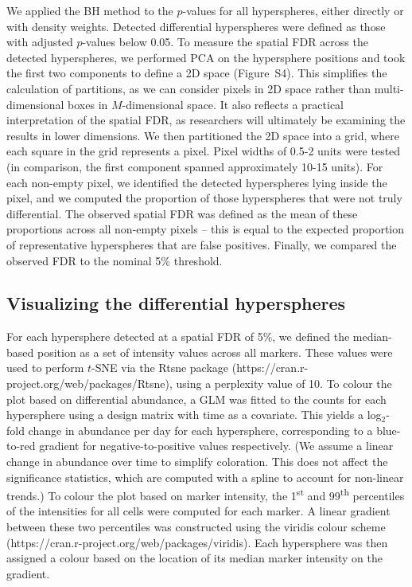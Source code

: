 \documentclass{article}
\newcommand{\suppfigfdr}{S4}
\begin{document}
We applied the BH method to the $p$-values for all hyperspheres, either directly or with density weights.
Detected differential hyperspheres were defined as those with adjusted $p$-values below 0.05.
To measure the spatial FDR across the detected hyperspheres, we performed PCA on the hypersphere positions and took the first two components to define a 2D space (Figure~\suppfigfdr{}).
This simplifies the calculation of partitions, as we can consider pixels in 2D space rather than multi-dimensional boxes in $M$-dimensional space.
It also reflects a practical interpretation of the spatial FDR, as researchers will ultimately be examining the results in lower dimensions.
We then partitioned the 2D space into a grid, where each square in the grid represents a pixel.
Pixel widths of 0.5-2 units were tested (in comparison, the first component spanned approximately 10-15 units).
For each non-empty pixel, we identified the detected hyperspheres lying inside the pixel, and we computed the proportion of those hyperspheres that were not truly differential.
The observed spatial FDR was defined as the mean of these proportions across all non-empty pixels --
this is equal to the expected proportion of representative hyperspheres that are false positives.
Finally, we compared the observed FDR to the nominal 5\% threshold.

\subsection{Visualizing the differential hyperspheres}
For each hypersphere detected at a spatial FDR of 5\%, we defined the median-based position as a set of intensity values across all markers.
These values were used to perform $t$-SNE via the Rtsne package (https://cran.r-project.org/web/packages/Rtsne), using a perplexity value of 10.
To colour the plot based on differential abundance, a GLM was fitted to the counts for each hypersphere using a design matrix with time as a covariate.
This yields a log$_2$-fold change in abundance per day for each hypersphere, corresponding to a blue-to-red gradient for negative-to-positive values respectively.
(We assume a linear change in abundance over time to simplify coloration.
This does not affect the significance statistics, which are computed with a spline to account for non-linear trends.)
To colour the plot based on marker intensity, the 1\textsuperscript{st} and 99\textsuperscript{th} percentiles of the intensities for all cells were computed for each marker.
A linear gradient between these two percentiles was constructed using the viridis colour scheme (https://cran.r-project.org/web/packages/viridis).
Each hypersphere was then assigned a colour based on the location of its median marker intensity on the gradient. 
\end{document}
